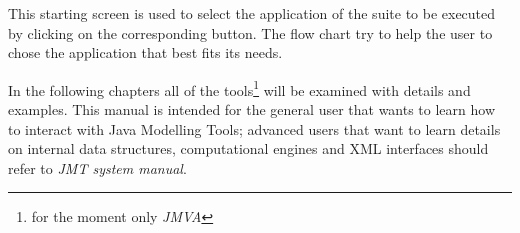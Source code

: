 This starting screen is used to select the application of the suite
to be executed by clicking on the corresponding button. The flow
chart try to help the user to chose the application that best fits
its needs.

In the following chapters all of the tools\footnote{for the moment
only \emph{JMVA}} will be examined with details and examples. This
manual is intended for the general user that wants to learn how to
interact with Java Modelling Tools; advanced users that want to
learn details on internal data structures, computational engines and
XML interfaces should refer to \emph{JMT system manual}.
